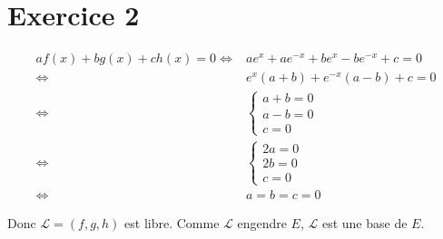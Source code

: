 \part{Exercice 2}

\begin{align*}
	af(x) + bg(x) + ch(x) = 0 \iff& ae^x + ae^{-x} + be^x -be^{-x} + c = 0\\
	\iff& e^x(a + b) + e^{-x}(a-b) + c = 0\\
	\iff& \begin{cases}
		a + b = 0\\
		a - b = 0\\
		c = 0
	\end{cases}\\
	\iff& \begin{cases}
		2a = 0\\
		2b = 0\\
		c = 0
	\end{cases}\\
	\iff& a = b = c = 0
\end{align*}

Donc $\mathcal{L} = (f,g,h)$ est libre. Comme $\mathcal{L}$ engendre $E$, $\mathcal{L}$ est une base de $E$.
